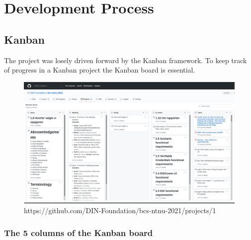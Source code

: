 \chapter{Development Process}

\section{Kanban}

The project was losely driven forward by the Kanban framework. To keep track of progress in a Kanban project the Kanban board is essential.

\begin{figure}[htbp]
  \centering
  \includegraphics[width=1\textwidth]{figures/github-kanban}
  \caption[Kanban board on Github]{https://github.com/DIN-Foundation/bcs-ntnu-2021/projects/1}
\end{figure}

\subsection{The 5 columns of the Kanban board}

